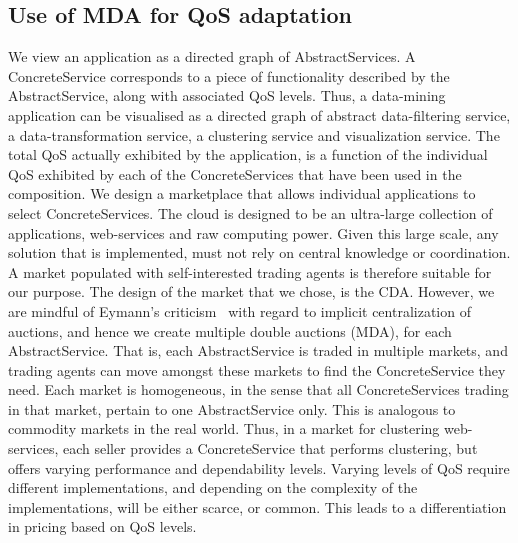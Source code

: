 \documentclass[10pt,journal,compsoc]{IEEEtran}
\begin{document}
\subsection{Use of MDA for QoS adaptation}
We view an application as a directed graph of AbstractServices. A ConcreteService corresponds to a piece of functionality described by the AbstractService, along with associated QoS levels. Thus, a data-mining application can be visualised as a directed graph of abstract data-filtering service, a data-transformation service, a clustering service and visualization service. The total QoS actually exhibited by the application, is a function of the individual QoS exhibited by each of the ConcreteServices that have been used in the composition. We design a marketplace that allows individual applications to select ConcreteServices. The cloud is designed to be an ultra-large collection of applications, web-services and raw computing power. Given this large scale, any solution that is implemented, must not rely on central knowledge or coordination. A market populated with self-interested trading agents is therefore suitable for our purpose. The design of the market that we chose, is the CDA.  However, we are mindful of Eymann's criticism~\cite{Eymann2003Decentralized} with regard to implicit centralization of auctions, and hence we create multiple double auctions (MDA), for each AbstractService. That is, each AbstractService is traded in multiple markets, and trading agents can move amongst these markets to find the ConcreteService they need. Each market is homogeneous, in the sense that all ConcreteServices trading in that market, pertain to one AbstractService only. This is analogous to commodity markets in the real world. Thus, in a market for clustering web-services, each seller provides a ConcreteService that performs clustering, but offers varying performance and dependability levels. Varying levels of QoS require different implementations, and depending on the complexity of the implementations, will be either scarce, or common. This leads to a differentiation in pricing based on QoS levels.    
\end{document}

